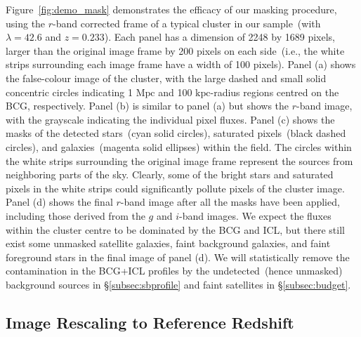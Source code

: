 \documentclass[fleqn,usenatbib]{mnras}
\newcommand{\mpc}{\mathrm{Mpc}}
\newcommand{\kpc}{\mathrm{kpc}}
\begin{document}
Figure~\ref{fig:demo_mask} demonstrates the efficacy of our masking
procedure, using the $r$-band corrected frame of a typical cluster in our
sample~(with $\lambda{=}42.6$ and $z{=}0.233$). Each panel has a dimension
of 2248 by 1689 pixels, larger than the original image frame by
200 pixels on each side~(i.e., the white strips surrounding each image
frame have a width of 100 pixels). Panel (a) shows the false-colour image
of the cluster, with the large dashed and small solid concentric circles
indicating 1 $\mpc$ and 100 $\kpc$-radius regions centred on the BCG,
respectively.  Panel (b) is similar to panel (a) but shows the $r$-band
image, with the grayscale indicating the individual pixel fluxes.  Panel
(c) shows the masks of the detected stars~(cyan solid circles), saturated
pixels~(black dashed circles), and galaxies~(magenta solid ellipses) within
the field. The circles within the white strips surrounding the original
image frame represent the sources from neighboring parts of the sky.
Clearly, some of the bright stars and saturated pixels in the white strips
could significantly pollute pixels of the cluster image. Panel (d)
shows the final $r$-band image after all the masks have been applied,
including those derived from the $g$ and $i$-band images. We expect the
fluxes within the cluster centre to be dominated by the BCG and ICL, but
there still exist some unmasked satellite galaxies, faint background
galaxies, and faint foreground stars in the final image of panel (d). We
will statistically remove the contamination in the BCG+ICL profiles by the
undetected~(hence unmasked) background sources in \S\ref{subsec:sbprofile}
and faint satellites in \S\ref{subsec:budget}.




\subsection{Image Rescaling to Reference Redshift}
\label{subsec:rescale}
\end{document}
